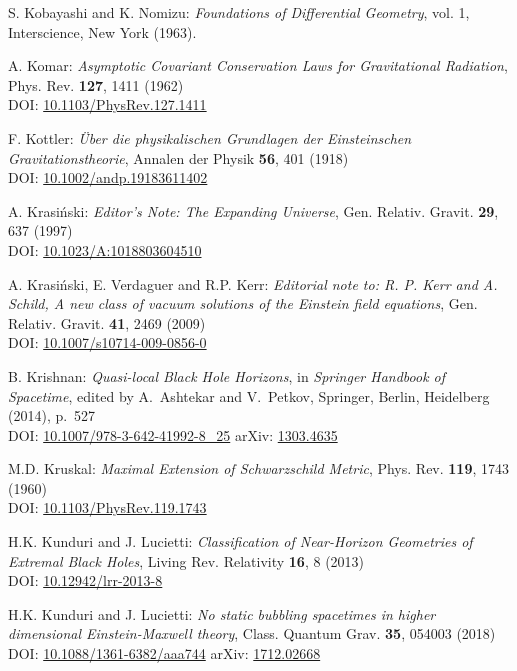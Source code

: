 \begin{thebibliography}{123}
S. Kobayashi and K. Nomizu:
{\em Foundations of Differential Geometry}, vol. 1,
Interscience, New York (1963).

A. Komar:
{\em Asymptotic Covariant Conservation Laws for Gravitational Radiation},
Phys. Rev. {\bf 127}, 1411 (1962)\\
DOI: \href{https://doi.org/10.1103/PhysRev.127.1411}{10.1103/PhysRev.127.1411}

F.  Kottler:
{\em \"Uber die physikalischen Grundlagen der Einsteinschen Gravitationstheorie},
Annalen der Physik {\bf 56}, 401 (1918)\\
DOI: \href{https://doi.org/10.1002/andp.19183611402}{10.1002/andp.19183611402}

A. Krasi\'nski:
{\em Editor's Note: The Expanding Universe},
Gen. Relativ. Gravit. {\bf 29}, 637 (1997)\\
DOI: \href{https://doi.org/10.1023/A:1018803604510}{10.1023/A:1018803604510}

A. Krasi\'nski, E. Verdaguer and R.P. Kerr:
{\em Editorial note to: R. P. Kerr and A. Schild, A new class of vacuum solutions of the Einstein field equations},
Gen. Relativ. Gravit. {\bf 41}, 2469 (2009)\\
DOI: \href{https://doi.org/10.1007/s10714-009-0856-0}{10.1007/s10714-009-0856-0}

B. Krishnan:
{\em Quasi-local Black Hole Horizons},
in {\em Springer Handbook of Spacetime}, edited by A.~Ashtekar and V.~Petkov,
Springer, Berlin, Heidelberg (2014), p.~527\\
DOI: \href{https://doi.org/10.1007/978-3-642-41992-8_25}{10.1007/978-3-642-41992-8\_25}\hfill
arXiv: \href{https://arxiv.org/abs/1303.4635}{1303.4635}

M.D. Kruskal:
{\em Maximal Extension of Schwarzschild Metric},
Phys. Rev. {\bf 119}, 1743 (1960)\\
DOI: \href{https://doi.org/10.1103/PhysRev.119.1743}{10.1103/PhysRev.119.1743}

H.K. Kunduri and J. Lucietti:
{\em Classification of Near-Horizon Geometries of Extremal Black Holes},
Living Rev. Relativity {\bf 16}, 8 (2013)\\
DOI: \href{https://doi.org/10.12942/lrr-2013-8}{10.12942/lrr-2013-8}

H.K. Kunduri and J. Lucietti:
{\em No static bubbling spacetimes in higher dimensional Einstein-Maxwell theory},
Class. Quantum Grav. {\bf 35}, 054003 (2018)\\
DOI: \href{https://doi.org/10.1088/1361-6382/aaa744}{10.1088/1361-6382/aaa744}\hfill
arXiv: \href{https://arxiv.org/abs/1712.02668}{1712.02668}


\end{thebibliography}
